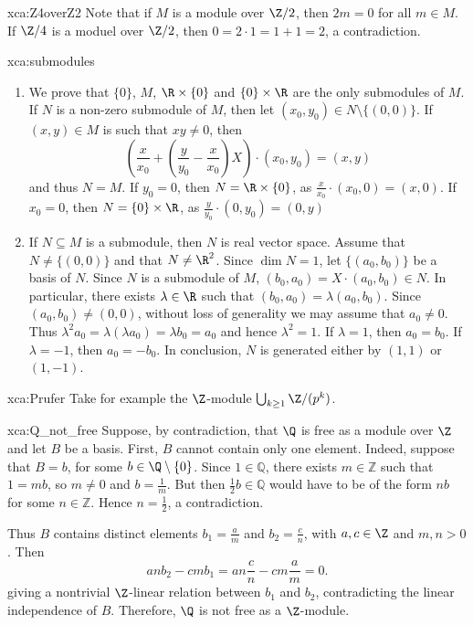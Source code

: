 \begin{sol}{xca:Z4overZ2}
	Note that if $M$ is a module over $\Z/2$, then $2m=0$ 
	for all $m\in M$.  If
	$\Z/4$ is a moduel over $\Z/2$, 
	then $0=2\cdot 1=1+1=2$, a contradiction. 
\end{sol}

\begin{sol}{xca:submodules}\
    \begin{enumerate}
        \item We prove that $\{0\}$, $M$, $\R\times\{0\}$ and $\{0\}\times\R$ are
        the only submodules of $M$. If $N$ is a non-zero submodule of $M$, then
        let $(x_0,y_0)\in N\setminus\{(0,0)\}$. If $(x,y)\in M$ is such that $xy\ne 0$, then
        \[
            \left(\frac{x}{x_0}+\left(\frac{y}{y_0}-\frac{x}{x_0}\right)X\right)\cdot (x_0,y_0)=(x,y) 
        \]
        and thus $N=M$. If $y_0=0$, then $N=\R\times\{0\}$, as $\frac{x}{x_0}\cdot (x_0,0)=(x,0)$. If $x_0=0$, then
        $N=\{0\}\times\R$, as 
        $\frac{y}{y_0}\cdot (0,y_0)=(0,y)$ 
            \item If $N\subseteq M$ is a submodule, then $N$ is real vector space. Assume that 
            $N\ne\{(0,0)\}$ and that $N\ne\R^2$. Since $\dim N=1$, 
            let $\{(a_0,b_0)\}$ be a basis of $N$. Since $N$ is a submodule of $M$, 
            $(b_0,a_0)=X\cdot (a_0,b_0)\in N$. In particular, there exists 
            $\lambda\in\R$ such that $(b_0,a_0)=\lambda (a_0,b_0)$. Since $(a_0,b_0)\ne(0,0)$, 
            without loss of generality we may assume that 
            $a_0\ne 0$. Thus 
            $\lambda^2 a_0=\lambda (\lambda a_0)=\lambda b_0=a_0$ and hence
            $\lambda^2=1$. If $\lambda=1$, then 
            $a_0=b_0$. If $\lambda=-1$, then $a_0=-b_0$. In conclusion, $N$ 
            is generated either by $(1,1)$ or $(1,-1)$.  
    \end{enumerate}
\end{sol}


\begin{sol}{xca:Prufer}
	Take for example the $\Z$-module $\bigcup_{k\geq1}\Z/(p^k)$.
\end{sol}

\begin{sol}{xca:Q_not_free}
    Suppose, by contradiction, that $\Q$ is free as a module over $\Z$
    and let $B$ be a basis.
    First, $B$ cannot contain only one element.
    Indeed, suppose that $B={b}$, for some $b\in\Q\setminus\{0\}$.
    Since $1\in\mathbb{Q}$, there exists $m\in\mathbb{Z}$ such that $1=mb$,
    so $m\neq0$ and $b=\frac{1}{m}$. 
    But then $\frac{1}{2}b\in\mathbb{Q}$ would have to be of the form $nb$
    for some $n\in\mathbb{Z}$. Hence $n=\frac12$, a contradiction. 
    
    Thus $B$ contains distinct elements $b_1=\frac{a}{m}$ and $b_2=\frac{c}{n}$,
    with $a,c\in\Z$ and $m,n>0$. Then
    \[
    an b_2-cm b_1
    =an \frac{c}{n}-cm \frac{a}{m}
    =0.
    \]
    giving a nontrivial $\Z$-linear relation between $b_1$ and $b_2$, contradicting the linear independence of $B$.
    Therefore, $\Q$ is not free as a $\Z$-module.
\end{sol}

